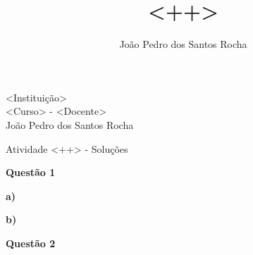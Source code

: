 \documentclass[a4paper, 12pt]{article}
\title{<++>}
\author{João Pedro dos Santos Rocha}
\begin{document}
\noindent <Instituição> \\
<Curso> - <Docente> \\
João Pedro dos Santos Rocha 

\begin{center}
    Atividade <++> - Soluções
\end{center}

\noindent \textbf{Questão 1}

    \noindent \textbf{a)}

    \noindent \textbf{b)}

\noindent \textbf{Questão 2}
\end{document}
